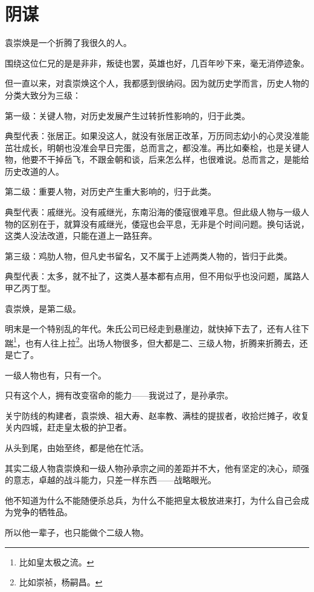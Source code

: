 \section{阴谋}
\ifnum{}
	\begin{multicols}{\theparacolNo}
		\fi
		袁崇焕是一个折腾了我很久的人。

		围绕这位仁兄的是是非非，叛徒也罢，英雄也好，几百年吵下来，毫无消停迹象。

		但一直以来，对袁崇焕这个人，我都感到很纳闷。因为就历史学而言，历史人物的分类大致分为三级：

		第一级：关键人物，对历史发展产生过转折性影响的，归于此类。

		典型代表：张居正。如果没这人，就没有张居正改革，万历同志幼小的心灵没准能茁壮成长，明朝也没准会早日完蛋，总而言之，都没准。再比如秦桧，也是关键人物，他要不干掉岳飞，不跟金朝和谈，后来怎么样，也很难说。总而言之，是能给历史改道的人。

		第二级：重要人物，对历史产生重大影响的，归于此类。

		典型代表：戚继光。没有戚继光，东南沿海的倭寇很难平息。但此级人物与一级人物的区别在于，就算没有戚继光，倭寇也会平息，无非是个时间问题。换句话说，这类人没法改道，只能在道上一路狂奔。

		第三级：鸡肋人物，但凡史书留名，又不属于上述两类人物的，皆归于此类。

		典型代表：太多，就不扯了，这类人基本都有点用，但不用似乎也没问题，属路人甲乙丙丁型。

		袁崇焕，是第二级。

		明末是一个特别乱的年代。朱氏公司已经走到悬崖边，就快掉下去了，还有人往下踹\footnote{比如皇太极之流。}，也有人往上拉\footnote{比如崇祯，杨嗣昌。}。出场人物很多，但大都是二、三级人物，折腾来折腾去，还是亡了。

		一级人物也有，只有一个。

		只有这个人，拥有改变宿命的能力——我说过了，是孙承宗。

		关宁防线的构建者，袁崇焕、祖大寿、赵率教、满桂的提拔者，收拾烂摊子，收复关内四城，赶走皇太极的护卫者。

		从头到尾，由始至终，都是他在忙活。

		其实二级人物袁崇焕和一级人物孙承宗之间的差距并不大，他有坚定的决心，顽强的意志，卓越的战斗能力，只差一样东西——战略眼光。

		他不知道为什么不能随便杀总兵，为什么不能把皇太极放进来打，为什么自己会成为党争的牺牲品。

		所以他一辈子，也只能做个二级人物。


\end{multicols}
